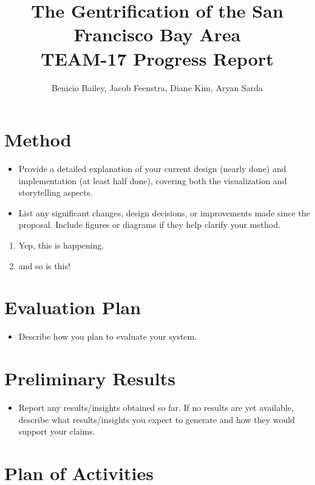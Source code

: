 \documentclass{article}
\title{The Gentrification of the San Francisco Bay Area \\ \large TEAM-17 Progress Report}
\author{Benicio Bailey, Jacob Feenstra, Diane Kim, Aryan Sarda}
\begin{document}
\maketitle

\section{Method}

\begin{itemize}
\item  Provide a detailed explanation of your current design (nearly done) and implementation (at least half done), covering both the visualization and storytelling aspects.
\item  List any significant changes, design decisions, or improvements made since the proposal. Include figures or diagrams if they help clarify your method.
\end{itemize}



\begin{enumerate}
\item Yep, this is happening.
\item and so is this!
\end{enumerate}

\section{Evaluation Plan}

\begin{itemize}
\item  Describe how you plan to evaluate your system. 
\end{itemize}


\section{Preliminary Results}

\begin{itemize}
\item  Report any results/insights obtained so far. If no results are yet available, describe what results/insights you expect to generate and how they would support your claims.
\end{itemize}

\section{Plan of Activities}
\end{document}
